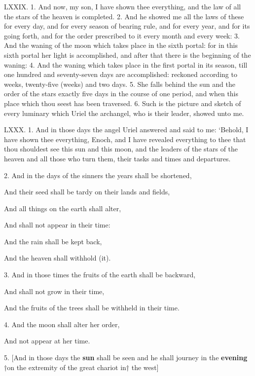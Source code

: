 
LXXIX. 1. And now, my son, I have shown thee
everything, and the law of all the stars of the heaven
is completed. 2. And he showed me all the laws of
these for every day, and for every season of bearing
rule, and for every year, and for its going forth, and
for the order prescribed to it every month and every
week: 3. And the waning of the moon which takes
place in the sixth portal: for in this sixth portal her
light is accomplished, and after that there is the beginning
of the waning: 4. And the waning which
takes place in the first portal in its season, till one
hundred and seventy-seven days are accomplished:
reckoned according to weeks, twenty-five (weeks)
and two days. 5. She falls behind the sun and the
order of the stars exactly five days in the course of
one period, and when this place which thou seest
has been traversed. 6. Such is the picture and sketch
of every luminary which Uriel the archangel, who is
their leader, showed unto me.

LXXX. 1. And in those days the angel Uriel
answered and said to me: ‘Behold, I have shown
thee everything, Enoch, and I have revealed everything
to thee that thou shouldest see this sun and this
moon, and the leaders of the stars of the heaven and
all those who turn them, their tasks and times and
departures.


2. And in the days of the sinners the years shall be shortened,

And their seed shall be tardy on their lands and fields,

And all things on the earth shall alter,

And shall not appear in their time:

And the rain shall be kept back,

And the heaven shall withhold (it).

3. And in those times the fruits of the earth shall be backward,

And shall not grow in their time,

And the fruits of the trees shall be withheld in their time.

4. And the moon shall alter her order,

And not appear at her time.

5. [And in those days the \textbf{sun} shall be seen and he shall journey in the \textbf{evening} †on the extremity of the great chariot in† the west]

